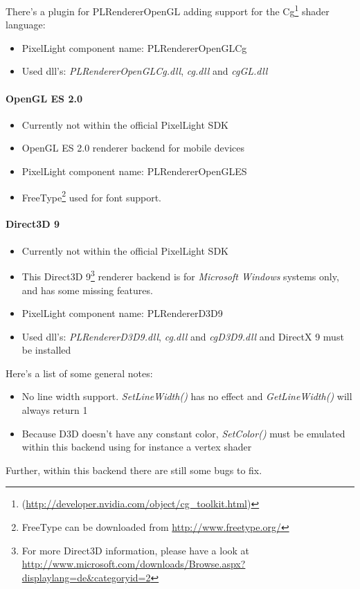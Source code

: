 There's a plugin for PLRendererOpenGL adding support for the Cg\footnote{(\url{http://developer.nvidia.com/object/cg_toolkit.html})} shader language:
\begin{itemize}
\item PixelLight component name: PLRendererOpenGLCg
\item Used dll's: \emph{PLRendererOpenGLCg.dll}, \emph{cg.dll} and \emph{cgGL.dll}
\end{itemize}


\paragraph{OpenGL ES 2.0}
\begin{itemize}
\item Currently not within the official PixelLight SDK
\item OpenGL ES 2.0 renderer backend for mobile devices
\item PixelLight component name: PLRendererOpenGLES
\item FreeType\footnote{FreeType can be downloaded from \url{http://www.freetype.org/}} used for font support.
\end{itemize}


\paragraph{Direct3D 9}
\begin{itemize}
\item Currently not within the official PixelLight SDK
\item This Direct3D 9\footnote{For more Direct3D information, please have a look at \url{http://www.microsoft.com/downloads/Browse.aspx?displaylang=de&categoryid=2}} renderer backend is for \emph{Microsoft Windows} systems only, and has some missing features.
\item PixelLight component name: PLRendererD3D9
\item Used dll's: \emph{PLRendererD3D9.dll}, \emph{cg.dll} and \emph{cgD3D9.dll} and DirectX 9 must be installed
\end{itemize}

Here's a list of some general notes:
\begin{itemize}
\item No line width support. \emph{SetLineWidth()} has no effect and \emph{GetLineWidth()} will always return 1
\item Because D3D doesn't have any constant color, \emph{SetColor()} must be emulated within this backend using for instance a vertex shader
\end{itemize}
Further, within this backend there are still some bugs to fix.


